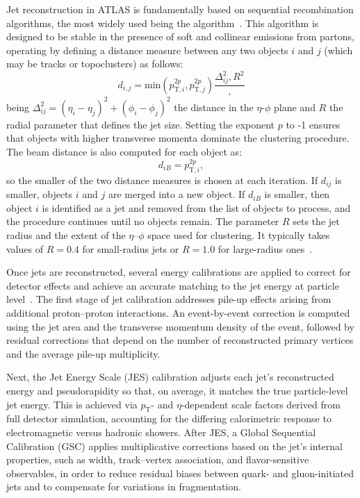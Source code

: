 Jet reconstruction in ATLAS is fundamentally based on sequential recombination algorithms, the most widely used being the \antikt algorithm~\cite{Cacciari_2008}. This algorithm is designed to be stable in the presence of soft and collinear emissions from partons, operating by defining a distance measure between any two objects $i$ and $j$ (which may be tracks or topoclusters) as follows:
\begin{equation}
  d_{i,j} = \text{min}(p^{2p}_{\text{T},i},p^{2p}_{\text{T},j})\frac{\Delta^{2}_{ij},R^{2}},
\end{equation}
being $\Delta^{2}_{ij} = (\eta_{i} - \eta_{j})^2 + (\phi_{i} - \phi_{j})^2$ the distance in the $\eta$-$\phi$ plane and $R$ the radial parameter that defines the jet size. Setting the exponent $p$ to -1 ensures that objects with higher transverse momenta dominate the clustering procedure. The beam distance is also computed for each object as:
\begin{equation}
  d_{iB} = p^{2p}_{\text{T},i},
\end{equation}
so the smaller of the two distance measures is chosen at each iteration. If \(d_{ij}\) is smaller, objects \(i\) and \(j\) are merged into a new object. If \(d_{iB}\) is smaller, then object \(i\) is identified as a jet and removed from the list of objects to process, and the procedure continues until no objects remain. The parameter \(R\) sets the jet radius and the extent of the \(\eta\)–\(\phi\) space used for clustering. It typically takes values of \(R = 0.4\) for small-radius jets or \(R = 1.0\) for large-radius ones~\cite{jets_cluster}.

Once jets are reconstructed, several energy calibrations are applied to correct for detector effects and achieve an accurate matching to the jet energy at particle level~\cite{jets_calib}. The first stage of jet calibration addresses pile-up effects arising from additional proton–proton interactions. An event-by-event correction is computed using the jet area and the transverse momentum density of the event, followed by residual corrections that depend on the number of reconstructed primary vertices and the average pile-up multiplicity. 

Next, the Jet Energy Scale (JES) calibration adjusts each jet’s reconstructed energy and pseudorapidity so that, on average, it matches the true particle-level jet energy. This is achieved via $p_{\text{T}}$- and $\eta$-dependent scale factors derived from full detector simulation, accounting for the differing calorimetric response to electromagnetic versus hadronic showers. After JES, a Global Sequential Calibration (GSC) applies multiplicative corrections based on the jet’s internal properties, such as width, track–vertex association, and flavor-sensitive observables, in order to reduce residual biases between quark- and gluon-initiated jets and to compensate for variations in fragmentation.

